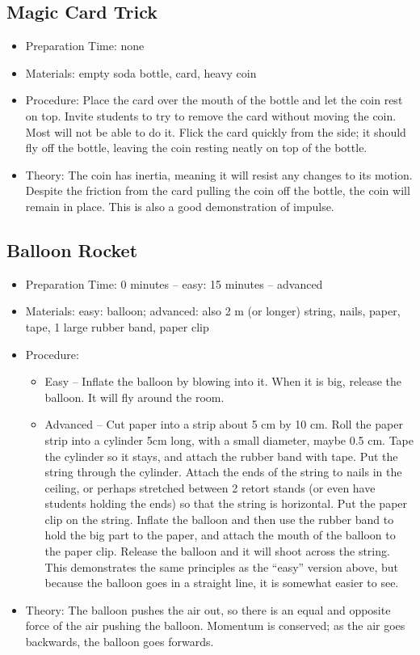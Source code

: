 \subsection{Magic Card Trick}
\begin{itemize}
\item{Preparation Time: none}
\item{Materials: empty soda bottle, card, heavy coin}
\item{Procedure: Place the card over the mouth of the bottle and let the coin rest on top. Invite students to try to remove the card without moving the coin. Most will not be able to do it. Flick the card quickly from the side; it should fly off the bottle, leaving the coin resting neatly on top of the bottle.}
\item{Theory: The coin has inertia, meaning it will resist any changes to its motion. Despite the friction from the card pulling the coin off the bottle, the coin will remain in place. This is also a good demonstration of impulse.}
\end{itemize}

\subsection{Balloon Rocket}
\begin{itemize}
\item{Preparation Time: 0 minutes – easy: 15 minutes – advanced}
\item{Materials: easy: balloon; advanced: also 2 m (or longer) string, nails, paper, tape, 1 large rubber band, paper clip}
\item{Procedure:
\begin{itemize}
\item{Easy – Inflate the balloon by blowing into it. When it is big, release the balloon. It will fly around the room.}
\item{Advanced – Cut paper into a strip about 5 cm by 10 cm. Roll the paper strip into a cylinder 5cm long, with a small diameter, maybe 0.5 cm. Tape the cylinder so it stays, and attach the rubber band with tape. Put the string through the cylinder. Attach the ends of the string to nails in the ceiling, or perhaps stretched between 2 retort stands (or even have students holding the ends) so that the string is horizontal. Put the paper clip on the string. Inflate the balloon and then use the rubber band to hold the big part to the paper, and attach the mouth of the balloon to the paper clip. Release the balloon and it will shoot across the string. This demonstrates the same principles as the “easy” version above, but because the balloon goes in a straight line, it is somewhat easier to see.}
\end{itemize}
} %
\item{Theory: The balloon pushes the air out, so there is an equal and opposite force of the air pushing the balloon. Momentum is conserved; as the air goes backwards, the balloon goes forwards.}
\end{itemize}

